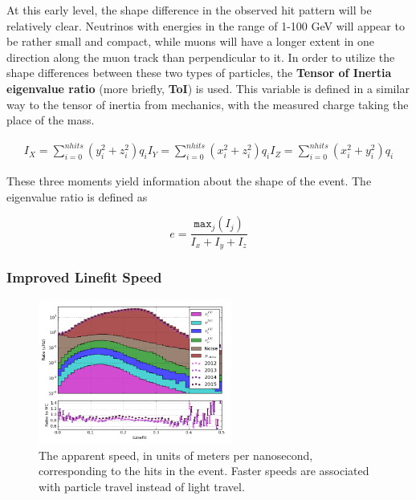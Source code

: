 At this early level, the shape difference in the observed hit pattern will be relatively clear.
Neutrinos with energies in the range of 1-100 GeV will appear to be rather small and compact, while muons will have a longer extent in one direction along the muon track than perpendicular to it.
In order to utilize the shape differences between these two types of particles, the \textbf{Tensor of Inertia eigenvalue ratio} (more briefly, \textbf{ToI}) is used.
This variable is defined in a similar way to the tensor of inertia from mechanics, with the measured charge taking the place of the mass.

\begin{eqnarray}
	I_{X} = \sum_{i=0}^{nhits}(y_i^2 + z_i^2)q_i	
	I_{Y} = \sum_{i=0}^{nhits}(x_i^2 + z_i^2)q_i
	I_{Z} = \sum_{i=0}^{nhits}(x_i^2 + y_i^2)q_i
\end{eqnarray}

These three moments yield information about the shape of the event.
The eigenvalue ratio is defined as 

\begin{equation}
	e = \frac{\mathtt{max}_j(I_j)}{I_{x}+I_{y}+I_{z}}
\end{equation}


\subsubsection{Improved Linefit Speed}
\begin{figure}[h]
	\centering
		\includegraphics[width=2.5in]{iLineFit_Log.png}
		\caption[The improvedLineFit Speed]{The apparent speed, in units of meters per nanosecond, corresponding to the hits in the event. Faster speeds are associated with particle travel instead of light travel.}
	\label{fig:ilinefit_log}
\end{figure}



